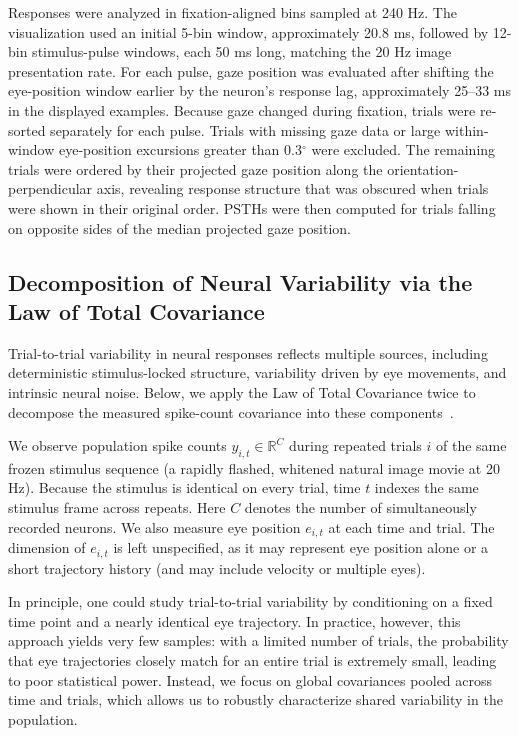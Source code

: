 \documentclass{lite}
\begin{document}
Responses were analyzed in fixation-aligned bins sampled at 240 Hz. The visualization used an initial 5-bin window, approximately 20.8 ms, followed by 12-bin stimulus-pulse windows, each 50 ms long, matching the 20 Hz image presentation rate. For each pulse, gaze position was evaluated after shifting the eye-position window earlier by the neuron's response lag, approximately 25--33 ms in the displayed examples. Because gaze changed during fixation, trials were re-sorted separately for each pulse. Trials with missing gaze data or large within-window eye-position excursions greater than 0.3$^\circ$ were excluded. The remaining trials were ordered by their projected gaze position along the orientation-perpendicular axis, revealing response structure that was obscured when trials were shown in their original order. PSTHs were then computed for trials falling on opposite sides of the median projected gaze position.

\subsection{Decomposition of Neural Variability via the Law of Total Covariance}

Trial-to-trial variability in neural responses reflects multiple sources, including deterministic stimulus-locked structure, variability driven by eye movements, and intrinsic neural noise. Below, we apply the Law of Total Covariance twice to decompose the measured spike-count covariance into these components~\cite{mcfarland2016variability}. 

We observe population spike counts $y_{i,t} \in \mathbb{R}^C$ during repeated trials $i$ of the same frozen stimulus sequence (a rapidly flashed, whitened natural image movie at 20 Hz). Because the stimulus is identical on every trial, time $t$ indexes the same stimulus frame across repeats. Here $C$ denotes the number of simultaneously recorded neurons. We also measure eye position $e_{i,t}$ at each time and trial. The dimension of $e_{i,t}$ is left unspecified, as it may represent eye position alone or a short trajectory history (and may include velocity or multiple eyes).

In principle, one could study trial-to-trial variability by conditioning on a fixed time point and a nearly identical eye trajectory. In practice, however, this approach yields very few samples: with a limited number of trials, the probability that eye trajectories closely match for an entire trial is extremely small, leading to poor statistical power. Instead, we focus on global covariances pooled across time and trials, which allows us to robustly characterize shared variability in the population.
\end{document}
